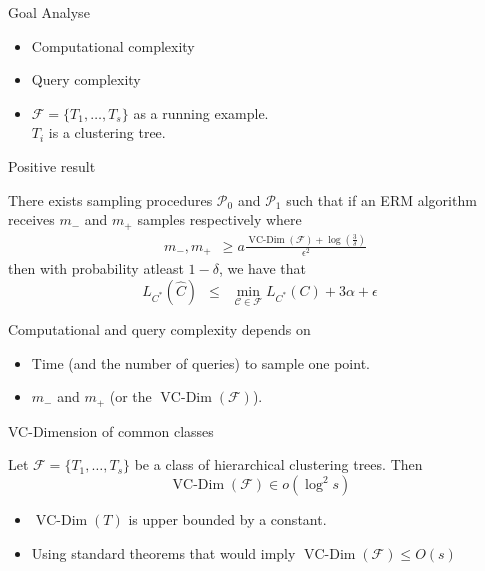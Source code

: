 \documentclass{beamer}
\newcommand{\mc}{\mathcal}
\DeclareMathOperator*{\vcdim}{VC-Dim}
\begin{document}
\begin{frame}{Goal}
Analyse
	\begin{itemize}
		\vspace{15pt}\item Computational complexity
		\vspace{15pt}\item Query complexity
		\vspace{20pt}\item $\mc F = \{T_1, \ldots, T_s\}$ as a running example.\\
		\vspace{10pt}$T_i$ is a clustering tree.
	\end{itemize}
\end{frame}

\begin{frame}[label=RCCPositive]{Positive result}
	\begin{block}{}
		There exists sampling procedures \hyperlink{detailsRCCNegative}{$\mc P_0$} and \hyperlink{detailsRCCPositive}{$\mc P_1$} such that if an ERM algorithm receives $m_-$ and $m_+$ samples respectively where
		\vspace{-10pt}\begin{align*}
		  &m_-, m_+ \enspace \ge a\frac{\vcdim({\mc F}) + \log(\frac{3}{\delta})}{\epsilon^2} 
		\end{align*}
		then with probability atleast $1-\delta$, we have that $$L_{C^*}(\hat C) \enspace\le\enspace \min_{\mc C \in \mc F} L_{C^*}(C) + 3\alpha + \epsilon$$
	\end{block}

	\vspace{10pt}Computational and query complexity depends on
	\begin{itemize}
		\vspace{5pt}\item Time (and the number of queries) to  \alert{sample one point}. 
		\vspace{5pt}\item $m_-$ and $m_+$ (or the \alert{$\vcdim(\mc F)$}). 
	\end{itemize}		
\end{frame}



\begin{frame}[label=RCCVCDim]{VC-Dimension of common classes}
	\begin{block}{}
		Let \hyperlink{detailsRCCVCDim}{$\mc F = \{T_1, \ldots, T_s\}$} be a class of hierarchical clustering trees. Then 
		$$\vcdim({\mc F}) \in o(\log^2 s) $$
	\end{block}
	
	\begin{itemize}
		\vspace{20pt}\item $\vcdim(T)$ is upper bounded by a constant.
		\vspace{10pt}\item Using standard theorems that would imply $\vcdim(\mc F) \le O(s)$
	\end{itemize}
\end{frame}
\end{document}
